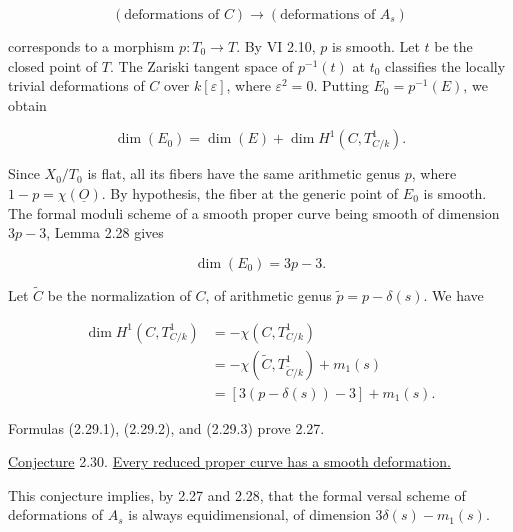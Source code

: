 \begin{equation*}
(\text{deformations of }C)\longrightarrow(\text{deformations of }A_s)
\end{equation*}

corresponds to a morphism $p:T_0\longrightarrow T$.  By VI 2.10, $p$ is
smooth.  Let $t$ be the closed point of $T$.  The Zariski tangent space of
$p^{-1}(t)$ at $t_0$ classifies the locally trivial deformations of $C$ over
$k[\varepsilon]$, where $\varepsilon^2=0$.  Putting $E_0=p^{-1}(E)$, we obtain

\begin{equation}\tag{2.29.1}
\dim(E_0)=\dim(E)+\dim H^1(C,T^1_{C/k}).
\end{equation}

Since $X_0/T_0$ is flat, all its fibers have the same arithmetic genus $p$,
where $1-p=\chi(\underline O)$.  By hypothesis, the fiber at the generic point
of $E_0$ is smooth.  The formal moduli scheme of a smooth proper curve being
smooth of dimension $3p-3$, Lemma 2.28 gives

\begin{equation}\tag{2.29.2}
\dim(E_0)=3p-3.
\end{equation}

Let $\widetilde C$ be the normalization of $C$, of arithmetic genus
$\widetilde p=p-\delta(s)$.  We have

\begin{equation}\tag{2.29.3}
\begin{aligned}
\dim H^1(C,T^1_{C/k})
&=-\chi(C,T^1_{C/k})\\
&=-\chi(\widetilde C,T^1_{\widetilde C/k})+m_1(s)\\
&=[3(p-\delta(s))-3]+m_1(s).
\end{aligned}
\end{equation}

Formulas (2.29.1), (2.29.2), and (2.29.3) prove 2.27.

\underline{Conjecture} 2.30. \underline{Every reduced proper curve has a
smooth deformation.}

This conjecture implies, by 2.27 and 2.28, that the formal versal scheme of
deformations of $A_s$ is always equidimensional, of dimension
$3\delta(s)-m_1(s)$.
